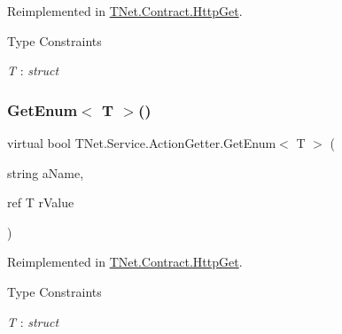 Reimplemented in \mbox{\hyperlink{class_t_net_1_1_contract_1_1_http_get_aaf0d1200e3ae1fed4fafce2a029e0765}{T\+Net.\+Contract.\+Http\+Get}}.

\begin{Desc}
\item[Type Constraints]\begin{description}
\item[{\em T} : {\em struct}]\end{description}
\end{Desc}
\mbox{\label{class_t_net_1_1_service_1_1_action_getter_aceae772830322b5f8ab88b31d8b31835}} 
\subsubsection{\texorpdfstring{Get\+Enum$<$ T $>$()}{GetEnum< T >()}\hspace{0.1cm}{\footnotesize\ttfamily [2/2]}}
{\footnotesize\ttfamily virtual bool T\+Net.\+Service.\+Action\+Getter.\+Get\+Enum$<$ T $>$ (\begin{DoxyParamCaption}\item[{string}]{a\+Name,  }\item[{ref T}]{r\+Value }\end{DoxyParamCaption})\hspace{0.3cm}{\ttfamily [virtual]}}







Reimplemented in \mbox{\hyperlink{class_t_net_1_1_contract_1_1_http_get_aa2cbfe47248fe3d1abce83bf71d2f383}{T\+Net.\+Contract.\+Http\+Get}}.

\begin{Desc}
\item[Type Constraints]\begin{description}
\item[{\em T} : {\em struct}]\end{description}
\end{Desc}
\mbox{\label{class_t_net_1_1_service_1_1_action_getter_a1aee020aa39f0a8bdfc46d44ac43219b}} 

